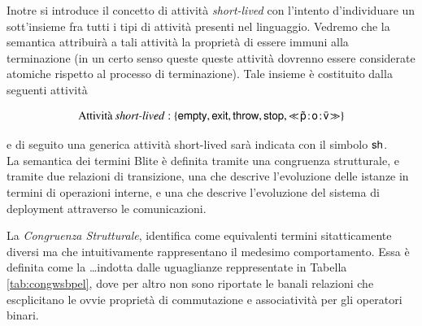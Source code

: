 Inotre si introduce il concetto di attività \emph{short-lived} con l'intento
d'individuare un sott'insieme fra tutti i tipi di attività presenti nel
linguaggio. Vedremo che la semantica attribuirà a tali attività la proprietà di
essere immuni alla terminazione (in un certo senso queste queste attività
dovrenno essere considerate atomiche rispetto al processo di terminazione).
Tale insieme è costituito dalla seguenti attività

$$
\textrm{Attività \emph{short-lived}} : \{ {\sf empty}, {\sf exit},
{\sf throw}, {\sf stop}, \ll\!\tilde{{\sf p}}\! : \! {\sf o}\! : \! \bar{{\sf v}}\!\gg \}
$$

e di seguito una generica attività short-lived sarà indicata con
il simbolo ${\sf sh}$.
\\

La semantica dei termini Blite è definita tramite una congruenza strutturale, e
tramite due relazioni di transizione, una che descrive l'evoluzione delle
istanze in termini di operazioni interne, e una che descrive l'evoluzione del sistema
di deployment attraverso le comunicazioni. 

La \emph{Congruenza Strutturale}, identifica come equivalenti termini
sitatticamente diversi ma che intuitivamente rappresentano il medesimo
comportamento. Essa è definita come la \ldots indotta dalle uguaglianze
reppresentate in Tabella \ref{tab:congwsbpel}, dove per altro non sono
riportate le banali relazioni che escplicitano le ovvie proprietà di
commutazione e associatività per gli operatori binari.

